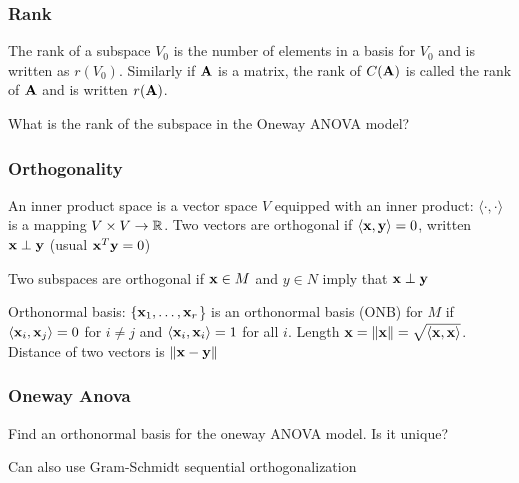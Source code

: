 \documentclass[handout]{beamer}
\begin{document}
\begin{frame} \frametitle{Rank}
  \begin{definition}
    The rank of a subspace $V_0$ is the number of elements in a basis
    for $V_0$ and is written as $r(V_0)$.  Similarly if $\mathbf{A}$ is a
    matrix, the rank of $C(\mathbf{A})$ is called the rank of $\mathbf{A}$ and is
    written $r(\mathbf{A})$.
  \end{definition} \pause
What is the rank of the subspace in the Oneway ANOVA model?
\end{frame}
\begin{frame}
  \frametitle{Orthogonality}
  \begin{definition}
An inner product space is a vector space $V$ equipped with an inner product: $\langle
\cdot, \cdot \rangle$ is a mapping $V \times V \rightarrow \mathbb{R}$.  Two vectors are orthogonal if $\langle \mathbf{x}, \mathbf{y}
    \rangle = 0$, written $\mathbf{x} \perp \mathbf{y}$ \pause   (usual $\mathbf{x}^T\mathbf{y} = 0$)
  \end{definition}
  \begin{definition}
    Two subspaces are orthogonal if $\mathbf{x} \in M$  and $y \in N$ imply
    that $\mathbf{x} \perp \mathbf{y}$ \pause
  \end{definition}
  \begin{definition}
    Orthonormal basis:  $\{\mathbf{x}_1, \ldots, \mathbf{x}_r$\} is an orthonormal
    basis  (ONB) for $M$ if $\langle \mathbf{x}_i, \mathbf{x}_j \rangle = 0$ for $i \neq j$ and
    $\langle \mathbf{x}_i, \mathbf{x}_i \rangle = 1$ for all $i$.  Length $\mathbf{x} = \|
    \mathbf{x} \| = \sqrt{\langle\mathbf{x}, \mathbf{x} \rangle}$.  Distance of two vectors is 
$\| \mathbf{x} - \mathbf{y} \|$
  \end{definition}
\end{frame}
\begin{frame} \frametitle{Oneway Anova}
  Find an orthonormal basis for the oneway ANOVA model.  Is it unique?
  \pause

\vspace{2in}
Can also use Gram-Schmidt sequential orthogonalization
\end{frame}
\end{document}
